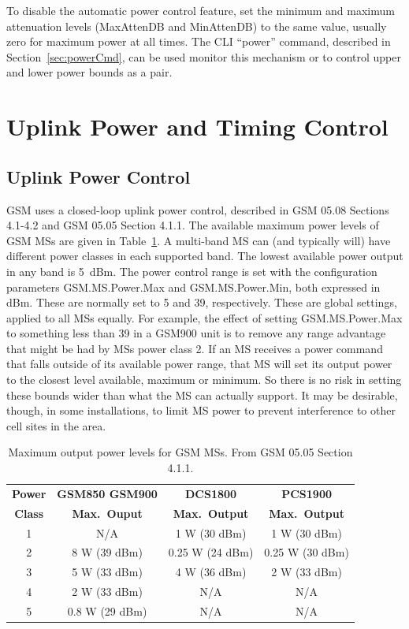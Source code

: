 \documentclass[11pt,openany]{book}
\begin{document}
To disable the automatic power control feature, set the minimum and maximum attenuation levels (MaxAttenDB and MinAttenDB) to the same value, usually zero for maximum power at all times.
The CLI ``power'' command, described in Section~\ref{sec:powerCmd}, can be used monitor this mechanism or to control upper and lower power bounds as a pair.


\section{Uplink Power and Timing Control}
\label{sec:closedLoop}
\subsection{Uplink Power Control}
GSM uses a closed-loop uplink power control, described in GSM 05.08 Sections 4.1-4.2 and GSM 05.05 Section 4.1.1.   The available maximum power levels of GSM MSs are given in Table~\ref{tab:MSPower}.  A multi-band MS can (and typically will) have different power classes in each supported band.
The lowest available power output in any band is 5~dBm.
The power control range is set with the configuration parameters GSM.MS.Power.Max and GSM.MS.Power.Min, both expressed in dBm. These are normally set to 5 and 39, respectively. These are global settings, applied to all MSs equally.
For example, the effect of setting GSM.MS.Power.Max to something less than 39 in a GSM900 unit is to remove any range advantage that might be had by MSs power class 2.  If an MS receives a power command that falls outside of its available power range, that MS will set its output power to the closest level available, maximum or minimum.  So there is no risk in setting these bounds wider than what the MS can actually support.
It may be desirable, though, in some installations, to limit MS power to prevent interference to other cell sites in the area.

\begin{table}[htdp]
\caption{Maximum output power levels for GSM MSs.  From GSM 05.05 Section 4.1.1.}
\begin{center}
\begin{tabular}{|c|c|c|c|}
\hline
{\bf Power} 	& {\bf GSM850 GSM900} 	& {\bf DCS1800} 	& {\bf PCS1900} \\ 
{\bf Class}		& {\bf Max.\ Ouput} 		& {\bf Max.\ Output} 	& {\bf Max.\ Output} \\ \hline \hline
1 			& N/A 				& 1 W (30 dBm) 	& 1 W (30 dBm)  \\ \hline
2 & 8 W (39 dBm) & 0.25 W (24 dBm) & 0.25 W (30 dBm) \\ \hline
3 & 5 W (33 dBm) & 4 W (36 dBm) & 2 W (33 dBm) \\ \hline
4 & 2 W (33 dBm) & N/A & N/A \\ \hline
5  & 0.8 W (29 dBm) & N/A & N/A \\ \hline
\end{tabular}
\end{center}
\label{tab:MSPower}
\end{table}%
\end{document}
